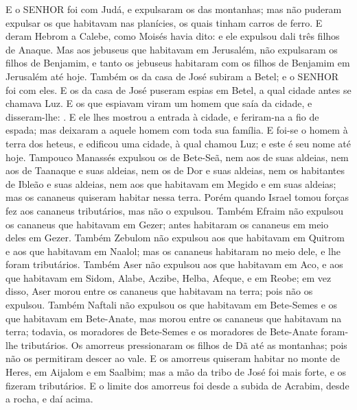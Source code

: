 {  E o SENHOR foi com Judá, e expulsaram os das montanhas; mas não puderam expulsar os que habitavam nas planícies, os quais tinham carros de ferro.
  E deram Hebrom a Calebe, como Moisés havia dito: e ele expulsou dali três filhos de Anaque.
  Mas aos jebuseus que habitavam em Jerusalém, não expulsaram os filhos de Benjamim, e tanto os jebuseus habitaram com os filhos de Benjamim em Jerusalém até hoje.
  Também os da casa de José subiram a Betel; e o SENHOR foi com eles.
  E os da casa de José puseram espias em Betel, a qual cidade antes se chamava Luz.
  E os que espiavam viram um homem que saía da cidade, e disseram-lhe: .
  E ele lhes mostrou a entrada à cidade, e feriram-na a fio de espada; mas deixaram a aquele homem com toda sua família.
  E foi-se o homem à terra dos heteus, e edificou uma cidade, à qual chamou Luz; e este é seu nome até hoje. %
  Tampouco Manassés expulsou os de Bete-Seã, nem aos de suas aldeias, nem aos de Taanaque e suas aldeias, nem os de Dor e suas aldeias, nem os habitantes de Ibleão e suas aldeias, nem aos que habitavam em Megido e em suas aldeias; mas os cananeus quiseram habitar nessa terra.
  Porém quando Israel tomou forças fez aos cananeus tributários, mas não o expulsou.
  Também Efraim não expulsou os cananeus que habitavam em Gezer; antes habitaram os cananeus em meio deles em Gezer.
  Também Zebulom não expulsou aos que habitavam em Quitrom e aos que habitavam em Naalol; mas os cananeus habitaram no meio dele, e lhe foram tributários.
  Também Aser não expulsou aos que habitavam em Aco, e aos que habitavam em Sidom, Alabe, Aczibe, Helba, Afeque, e em Reobe;
  em vez disso, Aser morou entre os cananeus que habitavam na terra; pois não os expulsou.
  Também Naftali não expulsou os que habitavam em Bete-Semes e os que habitavam em Bete-Anate, mas morou entre os cananeus que habitavam na terra; todavia, os moradores de Bete-Semes e os moradores de Bete-Anate foram-lhe tributários.
  Os amorreus pressionaram os filhos de Dã até as montanhas; pois não os permitiram descer ao vale.
  E os amorreus quiseram habitar no monte de Heres, em Aijalom e em Saalbim; mas a mão da tribo
 de José foi mais forte, e os fizeram tributários.
  E o limite dos amorreus foi desde a subida de Acrabim, desde a rocha, e daí acima.
\par }

